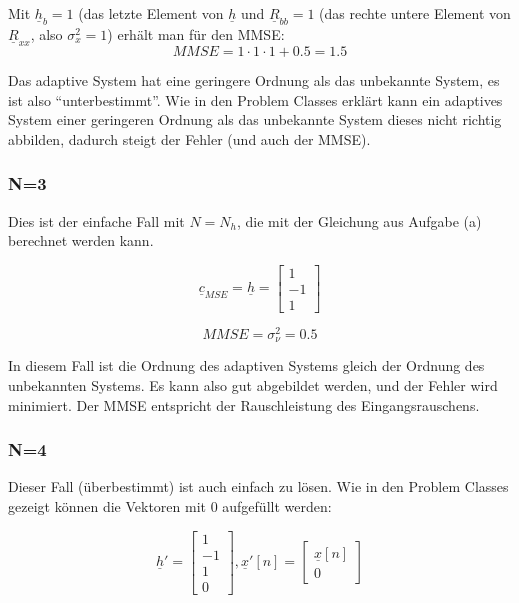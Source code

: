 Mit $\underline{h}_b = 1$ (das letzte Element von $\underline{h}$ und $\underline{R}_{bb} = 1$ (das rechte untere Element von $\underline{R}_{xx}$, also $\sigma_x^2 = 1$) erhält man für den MMSE:
\begin{equation}
 MMSE = 1 \cdot 1 \cdot 1 + 0.5 = 1.5
\end{equation}

Das adaptive System hat eine geringere Ordnung als das unbekannte System, es ist also ``unterbestimmt''. Wie in den Problem Classes erklärt kann ein adaptives System einer geringeren Ordnung als das unbekannte System dieses nicht richtig abbilden, dadurch steigt der Fehler (und auch der MMSE).

\subsubsection{N=3}

Dies ist der einfache Fall mit $N=N_h$, die mit der Gleichung aus Aufgabe (a) berechnet werden kann.

\begin{equation}
 \underline{c}_{MSE} = \underline{h} = \begin{bmatrix} 1 \\ -1 \\ 1 \end{bmatrix}
\end{equation}

\begin{equation}
 MMSE = \sigma_\nu^2 = 0.5
\end{equation}

In diesem Fall ist die Ordnung des adaptiven Systems gleich der Ordnung des unbekannten Systems. Es kann also gut abgebildet werden, und der Fehler wird minimiert. Der MMSE entspricht der Rauschleistung des Eingangsrauschens.


\subsubsection{N=4}

Dieser Fall (überbestimmt) ist auch einfach zu lösen. Wie in den Problem Classes gezeigt können die Vektoren mit 0 aufgefüllt werden:

$$ \underline{h}' = \begin{bmatrix} 1 \\ -1 \\ 1 \\ 0 \end{bmatrix}, \underline{x}'[n] = \begin{bmatrix} \underline{x}[n] \\ 0 \end{bmatrix} $$

